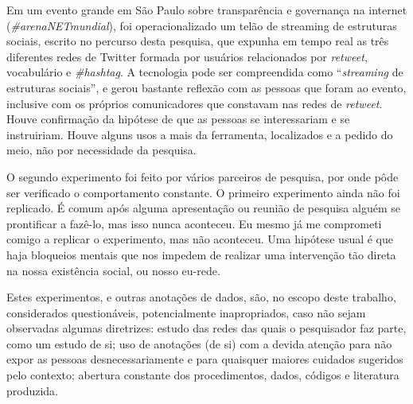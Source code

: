 \documentclass[a4paper,openright,12pt]{report} %
\begin{document}
	Em um evento grande em São Paulo sobre transparência e governança na internet (\emph{\#arenaNETmundial}),
        foi operacionalizado um telão de streaming de estruturas sociais, escrito
        no percurso desta pesquisa, que expunha em tempo real as três diferentes redes de Twitter
        formada por usuários relacionados por \emph{retweet}, vocabulário e \emph{\#hashtag}.
        A tecnologia pode ser compreendida como ``\emph{streaming} de estruturas sociais'',
        e gerou bastante reflexão com as pessoas que foram ao evento, inclusive
	com os próprios comunicadores que constavam nas redes de \emph{retweet}.~\cite{ocupagov}
        Houve confirmação da hipótese de que as pessoas se interessariam e se instruiriam.
        Houve alguns usos a mais da ferramenta, localizados e a pedido do meio, não
        por necessidade da pesquisa.

O segundo experimento foi feito por vários parceiros de pesquisa,
por onde pôde ser verificado o comportamento constante.
O primeiro experimento ainda não foi replicado.
É comum após alguma apresentação ou reunião de pesquisa
alguém se prontificar a fazê-lo,
mas isso nunca aconteceu. 
Eu mesmo já me comprometi comigo a replicar o experimento,
mas não aconteceu. Uma hipótese usual é que haja bloqueios
mentais que nos impedem de realizar uma intervenção tão direta
na nossa existência social, ou nosso eu-rede.~\cite{latour2013,ciberiun}

Estes experimentos, e outras anotações de dados, são, no escopo deste
trabalho, considerados questionáveis, potencialmente inapropriados,
caso não sejam observadas algumas diretrizes:
    estudo das redes das quais o pesquisador faz parte, como um estudo de si;
    uso de anotações (de si) com a devida atenção para não expor as pessoas desnecessariamente
    e para quaisquer maiores cuidados sugeridos pelo contexto;
    abertura constante dos procedimentos, dados, códigos e literatura produzida.

\end{document}
